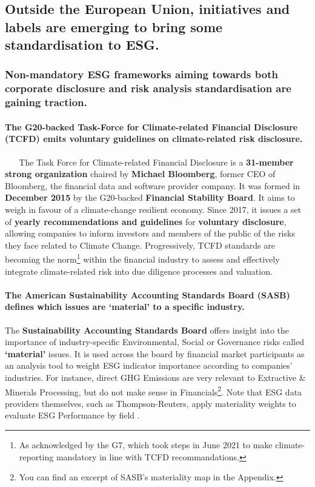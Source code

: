 \documentclass[12pt]{report}
\begin{document}
\subsection{Outside the European Union, initiatives and labels are emerging to bring some standardisation to ESG.}
\subsubsection{Non-mandatory ESG frameworks aiming towards both corporate disclosure and risk analysis standardisation are gaining traction. }

\paragraph{The G20-backed Task-Force for Climate-related Financial Disclosure (TCFD) emits voluntary guidelines on climate-related risk disclosure.}
\textcolor{white}{bla}\newline
The Task Force for Climate-related Financial Disclosure is a \textbf{31-member strong organization} chaired by \textbf{Michael Bloomberg}, former CEO of Bloomberg, the financial data and software provider company. It was formed in \textbf{December 2015} by the G20-backed \textbf{Financial Stability Board}. It aims to weigh in favour of a climate-change resilient economy.\newline
Since 2017, it issues a set of \textbf{yearly recommendations and guidelines} for \textbf{voluntary disclosure}, allowing companies to inform investors and members of the public of the risks they face related to Climate Change.\newline
Progressively, TCFD standards are becoming the norm\footnote{As acknowledged by the G7, which took steps in June 2021 to make climate-reporting mandatory in line with TCFD recommandations.} within the financial industry to assess and effectively integrate climate-related risk into due diligence processes and valuation.\newline

\paragraph{The American Sustainability Accounting Standards Board (SASB) defines which issues are ‘material’ to a specific industry.}
The \textbf{Sustainability Accounting Standards Board} offers insight into the importance of industry-specific Environmental, Social or Governance  risks called \textbf{‘material’} issues. It is used across the board by financial market participants as an analysis tool to weight ESG indicator importance according to companies' industries. For instance, direct GHG Emissions are very relevant to Extractive \& Minerals Processing, but do not make sense in Financials\footnote{You can find an excerpt of SASB’s materiality map in the Appendix.}. Note that ESG data providers themselves, such as Thompson-Reuters, apply materiality weights to evaluate ESG Performance by field \citep{refinitiv}.
\end{document}
